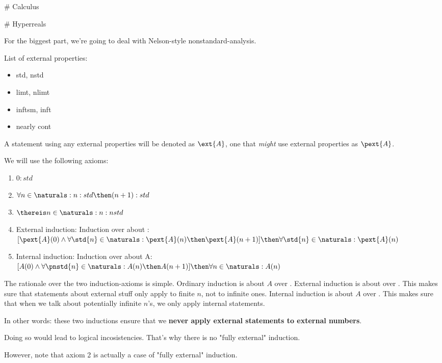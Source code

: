 # Calculus

# Hyperreals

For the biggest part, we're going to deal with Nelson-style nonstandard-analysis. 

List of external properties:
\begin{itemize}
    \item std, nstd
    \item limt, nlimt
    \item inftsm, inft
    \item nearly cont
\end{itemize}

A statement using any external properties will be denoted as $\ext{A}$, one that \emph{might} use external properties as $\pext{A}$.

We will use the following axioms:
\begin{enumerate}
    \item $0:std$
    \item $\forall n \in \naturals: n:std \then (n+1):std $
    \item $\thereis n \in \naturals: n:nstd $
    \item External induction: Induction  over  about : \\ 
    $ [ \pext{A}(0) \land \forall \std{n} \in \naturals: \pext{A}(n) \then \pext{A}(n+1) ] \then \forall \std{n} \in \naturals: \pext{A}(n)$
    \item Internal induction: Induction over  about A: \\
    $ [A(0) \land \forall \pnstd{n} \in \naturals: A(n) \then A(n+1)] \then \forall n \in \naturals: A(n) $
\end{enumerate}

The rationale over the two induction-axioms is simple. Ordinary induction is about $A$ over . 
External induction is about  over . This makes sure that statements about external stuff only apply to finite $n$, not to infinite ones. 
Internal induction is about $A$ over . This makes sure that when we talk about potentially infinite $n$'s, we only apply internal statements.

In other words: these two inductions ensure that we \textbf{never apply external statements to external numbers}. 

Doing so would lead to logical incosistencies. That's why there is no "fully external" induction.

However, note that axiom 2 is actually a case of "fully external" induction.


